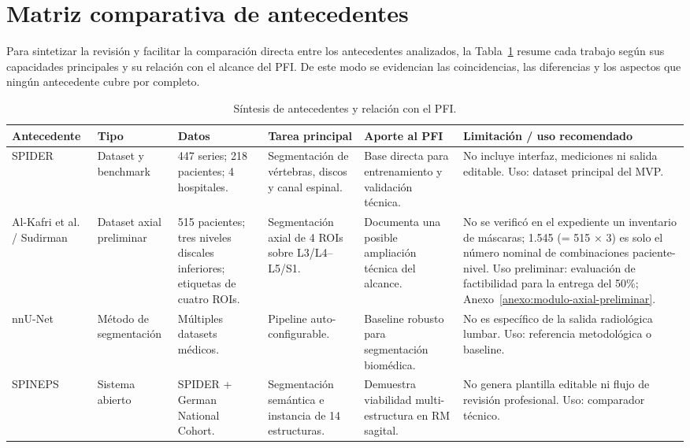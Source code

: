 \Needspace{0.92\textheight}
\section{Matriz comparativa de antecedentes}

Para sintetizar la revisión y facilitar la comparación directa entre los antecedentes analizados, la Tabla~\ref{tab:sintesis_antecedentes_pfi} resume cada trabajo según sus capacidades principales y su relación con el alcance del PFI. De este modo se evidencian las coincidencias, las diferencias y los aspectos que ningún antecedente cubre por completo.

\begin{table}[H]
\centering
\scriptsize
\setlength{\tabcolsep}{3pt}
\renewcommand{\arraystretch}{1.12}
\caption{Síntesis de antecedentes y relación con el PFI.}
\label{tab:sintesis_antecedentes_pfi}
\begin{adjustbox}{width=\textwidth}
\begin{tabularx}{\textwidth}{p{} p{} p{} X X X}
\hline
\textbf{Antecedente} & \textbf{Tipo} & \textbf{Datos} & \textbf{Tarea principal} & \textbf{Aporte al PFI} & \textbf{Limitación / uso recomendado} \\
\hline
SPIDER \parencite{vandergraaf_spider_2024} & Dataset y benchmark & 447 series; 218 pacientes; 4 hospitales. & Segmentación de vértebras, discos y canal espinal. & Base directa para entrenamiento y validación técnica. & No incluye interfaz, mediciones ni salida editable. Uso: dataset principal del MVP. \\
Al-Kafri et al. / Sudirman \parencite{alkafri_sudirman_boundary_2019} & Dataset axial preliminar & 515 pacientes; tres niveles discales inferiores; etiquetas de cuatro ROIs. & Segmentación axial de 4 ROIs sobre L3/L4--L5/S1. & Documenta una posible ampliación técnica del alcance. & No se verificó en el expediente un inventario de máscaras; 1.545 (= 515 × 3) es solo el número nominal de combinaciones paciente-nivel. Uso preliminar: evaluación de factibilidad para la entrega del 50\%; Anexo~\ref{anexo:modulo-axial-preliminar}. \\
nnU-Net \parencite{isensee_nnunet_2021} & Método de segmentación & Múltiples datasets médicos. & Pipeline auto-configurable. & Baseline robusto para segmentación biomédica. & No es específico de la salida radiológica lumbar. Uso: referencia metodológica o baseline. \\
SPINEPS \parencite{moller_spineps_2025} & Sistema abierto & SPIDER + German National Cohort. & Segmentación semántica e instancia de 14 estructuras. & Demuestra viabilidad multi-estructura en RM sagital. & No genera plantilla editable ni flujo de revisión profesional. Uso: comparador técnico. \\

\end{tabularx}
\end{adjustbox}
\end{table}
